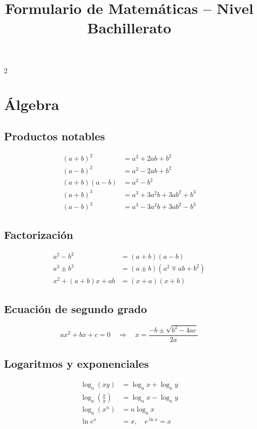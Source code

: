 \documentclass[12pt]{article}
\title{\textbf{Formulario de Matemáticas -- Nivel Bachillerato}}
\author{}
\date{}
\begin{document}
\maketitle

\begin{multicols}{2}
\raggedcolumns

\section*{Álgebra}

\subsection*{Productos notables}
\begin{align*}
    (a+b)^2 &= a^2 + 2ab + b^2 \\
    (a-b)^2 &= a^2 - 2ab + b^2 \\
    (a+b)(a-b) &= a^2 - b^2 \\
    (a+b)^3 &= a^3 + 3a^2b + 3ab^2 + b^3 \\
    (a-b)^3 &= a^3 - 3a^2b + 3ab^2 - b^3
\end{align*}

\subsection*{Factorización}
\begin{align*}
    a^2 - b^2 &= (a+b)(a-b) \\
    a^3 \pm b^3 &= (a \pm b)(a^2 \mp ab + b^2) \\
    x^2 + (a+b)x + ab &= (x+a)(x+b)
\end{align*}

\subsection*{Ecuación de segundo grado}
\[
ax^2 + bx + c = 0 \quad\Rightarrow\quad x = \frac{-b \pm \sqrt{b^2-4ac}}{2a}
\]

\subsection*{Logaritmos y exponenciales}
\begin{align*}
    \log_a(xy) &= \log_a x + \log_a y \\
    \log_a\left(\frac{x}{y}\right) &= \log_a x - \log_a y \\
    \log_a(x^n) &= n\log_a x \\
    \ln e^x &= x, \quad e^{\ln x} = x
\end{align*}


\end{multicols}
\end{document}

